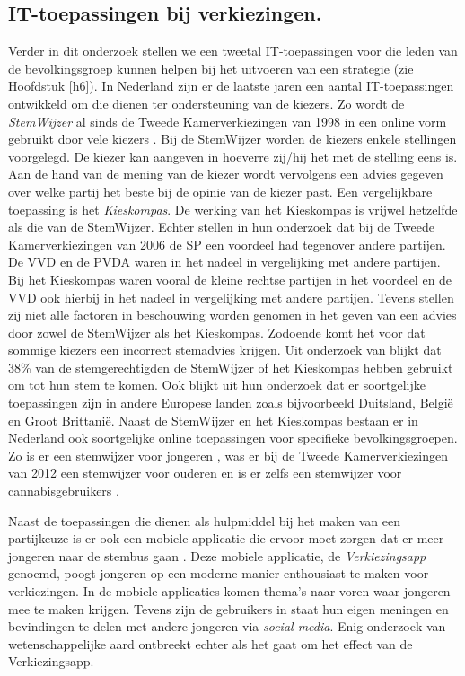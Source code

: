 \subsection{IT-toepassingen bij verkiezingen.}
Verder in dit onderzoek stellen we een tweetal IT-toepassingen voor die leden van de bevolkingsgroep kunnen helpen bij het uitvoeren van een strategie (zie Hoofdstuk \ref{h6}). In Nederland zijn er de laatste jaren een aantal IT-toepassingen ontwikkeld om die dienen ter ondersteuning van de kiezers. Zo wordt de \textit{StemWijzer} al sinds de Tweede Kamerverkiezingen van 1998 in een online vorm gebruikt door vele kiezers \citep{kleinnijenhuis2007nederland}. Bij de StemWijzer worden de kiezers enkele stellingen voorgelegd. De kiezer kan aangeven in hoeverre zij/hij het met de stelling eens is. Aan de hand van de mening van de kiezer wordt vervolgens een advies gegeven over welke partij het beste bij de opinie van de kiezer past. Een vergelijkbare toepassing is het \textit{Kieskompas}. De werking van het Kieskompas is vrijwel hetzelfde als die van de StemWijzer. Echter stellen \cite{kleinnijenhuis2007nederland} in hun onderzoek dat bij de Tweede Kamerverkiezingen van 2006 de SP een voordeel had tegenover andere partijen. De VVD en de PVDA waren in het nadeel in vergelijking met andere partijen. Bij het Kieskompas waren vooral de kleine rechtse partijen in het voordeel en de VVD ook hierbij in het nadeel in vergelijking met andere partijen. Tevens stellen zij niet alle factoren in beschouwing worden genomen in het geven van een advies door zowel de StemWijzer als het Kieskompas. Zodoende komt het voor dat sommige kiezers een incorrect stemadvies krijgen. Uit onderzoek van \cite{garzia2012voting} blijkt dat 38\% van de stemgerechtigden de StemWijzer of het Kieskompas hebben gebruikt om tot hun stem te komen. Ook blijkt uit hun onderzoek dat er soortgelijke toepassingen zijn in andere Europese landen zoals bijvoorbeeld Duitsland, Belgi\"{e} en Groot Brittani\"{e}. Naast de StemWijzer en het Kieskompas bestaan er in Nederland ook soortgelijke online toepassingen voor specifieke bevolkingsgroepen. Zo is er een stemwijzer voor jongeren \citep{Jonge36:online}, was er bij de Tweede Kamerverkiezingen van 2012 een stemwijzer voor ouderen \citep{Stemw79:online,Stemw68:online} en is er zelfs een stemwijzer voor cannabisgebruikers \citep{Canna56:online}.

Naast de toepassingen die dienen als hulpmiddel bij het maken van een partijkeuze is er ook een mobiele applicatie die ervoor moet zorgen dat er meer jongeren naar de stembus gaan \citep{Verki80:online}. Deze mobiele applicatie, de \textit{Verkiezingsapp} genoemd, poogt jongeren op een moderne manier enthousiast te maken voor verkiezingen. In de mobiele applicaties komen thema's naar voren waar jongeren mee te maken krijgen. Tevens zijn de gebruikers in staat hun eigen meningen en bevindingen te delen met andere jongeren via \textit{social media}. Enig onderzoek van wetenschappelijke aard ontbreekt echter als het gaat om het effect van de Verkiezingsapp. 


